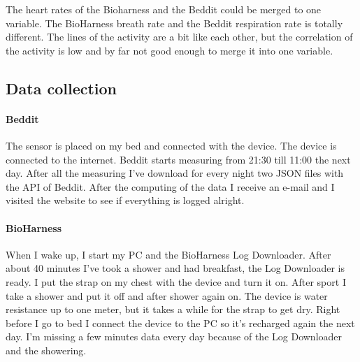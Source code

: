 			The heart rates of the Bioharness and the Beddit could be merged to one variable. The BioHarness breath rate and the Beddit respiration rate is totally different. The lines of the activity are a bit like each other, but the correlation of the activity is low and by far not good enough to merge it into one variable.

	\subsection{Data collection}
		\label{sec:datacollection}
		\paragraph{Beddit}
			The sensor is placed on my bed and connected with the device. The device is connected to the internet. Beddit starts measuring from 21:30 till 11:00 the next day. After all the measuring I've download for every night two JSON files with the API of Beddit\cite{bedditapi}. After the computing of the data I receive an e-mail and I visited the website to see if everything is logged alright.
		\paragraph{BioHarness}
			When I wake up, I start my PC and the BioHarness Log Downloader. After about 40 minutes I've took a shower and had breakfast, the Log Downloader is ready. I put the strap on my chest with the device and turn it on. After sport I take a shower and put it off and after shower again on. The device is water resistance up to one meter, but it takes a while for the strap to get dry. Right before I go to bed I connect the device to the PC so it's recharged again the next day. I'm missing a few minutes data every day because of the Log Downloader and the showering. 
